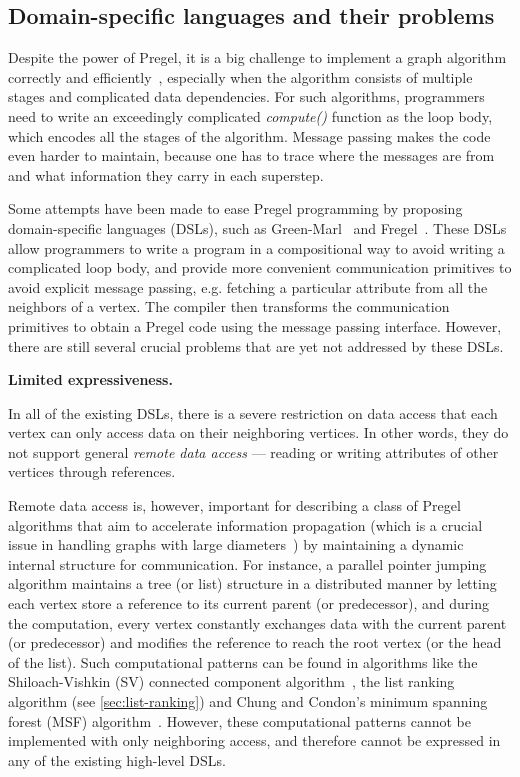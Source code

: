 \documentclass{sokendai_thesis} %
\begin{document}
\subsection{Domain-specific languages and their problems}

Despite the power of Pregel, it is a big challenge to implement a graph algorithm correctly and efficiently~\cite{yan2015effective}, especially when the algorithm consists of multiple stages and complicated data dependencies.
For such algorithms, programmers need to write an exceedingly complicated \textit{compute()} function as the loop body, which encodes all the stages of the algorithm.
Message passing makes the code even harder to maintain, because one has to trace where the messages are from and what information they carry in each superstep.

Some attempts have been made to ease Pregel programming by proposing domain-specific languages (DSLs), such as Green-Marl~\cite{green14} and Fregel~\cite{fregel}.
These DSLs allow programmers to write a program in a compositional way to avoid writing a complicated loop body, and provide more convenient communication primitives to avoid explicit message passing, e.g. fetching a particular attribute from all the neighbors of a vertex.
The compiler then transforms the communication primitives to obtain a Pregel code using the message passing interface.
However, there are still several crucial problems that are yet not addressed by these DSLs.

\textbf{Limited expressiveness.}

In all of the existing DSLs, there is a severe restriction on data access that each vertex can only access data on their neighboring vertices.
In other words, they do not support general \emph{remote data access} --- reading or writing attributes of other vertices through references.


Remote data access is, however, important for describing a class of Pregel algorithms that aim to accelerate information propagation (which is a crucial issue in handling graphs with large diameters~\cite{yan2015effective}) by maintaining a dynamic internal structure for communication.
For instance, a parallel pointer jumping algorithm maintains a tree (or list) structure in a distributed manner by letting each vertex store a reference to its current parent (or predecessor), and during the computation, every vertex constantly exchanges data with the current parent (or predecessor) and modifies the reference to reach the root vertex (or the head of the list).
Such computational patterns can be found in algorithms like the Shiloach-Vishkin (SV) connected component algorithm~\cite{yan2015effective}, the list ranking algorithm (see \autoref{sec:list-ranking}) and Chung and Condon's minimum spanning forest (MSF) algorithm~\cite{boruvka}.
However, these computational patterns cannot be implemented with only neighboring access, and therefore cannot be expressed in any of the existing high-level DSLs.
\end{document}
